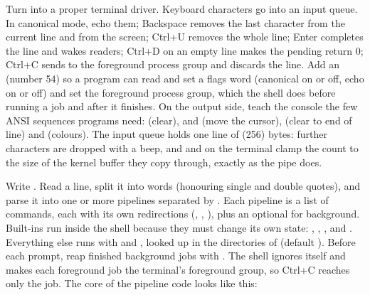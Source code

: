 \documentclass[11pt,a4paper]{article}
\begin{document}
Turn  into a proper terminal driver. Keyboard characters go into an input queue. In canonical mode, echo
them; Backspace removes the last character from the current line and from the screen; Ctrl+U removes the whole line;
Enter completes the line and wakes readers; Ctrl+D on an empty line makes the pending  return 0; Ctrl+C
sends  to the foreground process group and discards the line. Add an  (number 54) so a program
can read and set a flags word (canonical on or off, echo on or off) and set the foreground process group, which the
shell does before running a job and after it finishes. On the output side, teach the console the few ANSI sequences
programs need: \code{ESC [2J} (clear), \code{ESC [H} and \code{ESC [row;colH} (move the cursor), \code{ESC [K} (clear to
end of line) and \code{ESC [...m} (colours). The input queue holds one line of  (256) bytes: further
characters are dropped with a beep, and  and  on the terminal clamp the count to the size of
the kernel buffer they copy through, exactly as the pipe does.

Write . Read a line, split it into words (honouring single and double quotes), and parse it into
one or more pipelines separated by \code{;}. Each pipeline is a list of commands, each with its own redirections (\code{<}, \code{>}, \code{>>}), plus an optional \code{&} for
background. Built-ins run inside the shell because they must change its own state: , , ,
 and . Everything else runs with  and , looked up in the directories of
 (default ). Before each prompt, reap finished background jobs with
. The shell ignores  itself and makes each foreground job the
terminal's foreground group, so Ctrl+C reaches only the job. The core of the pipeline code looks like this:
\end{document}
